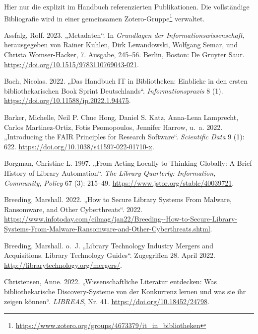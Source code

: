 \documentclass[
  11pt,
  letterpaper,
  DIV=11,
  twoside]{scrreprt}
\newlength{\cslhangindent}
\newenvironment{CSLReferences}[2] %
 {\begin{list}{}{%
  \setlength{\itemindent}{0pt}
  \setlength{\leftmargin}{0pt}
  \setlength{\parsep}{0pt}
  \ifodd #1
   \setlength{\leftmargin}{\cslhangindent}
   \setlength{\itemindent}{-1\cslhangindent}
  \fi
  \setlength{\itemsep}{#2\baselineskip}}}
 {\end{list}}
\DeclareRobustCommand{\href}[2]{#2\footnote{\url{#1}}}
\begin{document}
Hier nur die explizit im Handbuch referenzierten Publikationen. Die
vollständige Bibliografie wird
\href{https://www.zotero.org/groups/4673379/it_in_bibliotheken}{in einer
gemeinsamen Zotero-Gruppe} verwaltet.

\label{refs}
\begin{CSLReferences}{1}{0}
Assfalg, Rolf. 2023. {„Metadaten``}. In \emph{Grundlagen der
Informationswissenschaft}, herausgegeben von Rainer Kuhlen, Dirk
Lewandowski, Wolfgang Semar, und Christa Womser-Hacker, 7. Ausgabe,
245--56. Berlin, Boston: De Gruyter Saur.
\url{https://doi.org/10.1515/9783110769043-021}.

Bach, Nicolas. 2022. {„Das Handbuch {IT} in Bibliotheken: Einblicke in
den ersten bibliothekarischen Book Sprint Deutschlands``}.
\emph{Informationspraxis} 8 (1).
\url{https://doi.org/10.11588/ip.2022.1.94475}.

Barker, Michelle, Neil P. Chue Hong, Daniel S. Katz, Anna-Lena
Lamprecht, Carlos Martinez-Ortiz, Fotis Psomopoulos, Jennifer Harrow,
u.~a. 2022. {„Introducing the {FAIR} Principles for Research
Software``}. \emph{Scientific Data} 9 (1): 622.
\url{https://doi.org/10.1038/s41597-022-01710-x}.

Borgman, Christine L. 1997. {„From Acting Locally to Thinking Globally:
A Brief History of Library Automation``}. \emph{The Library Quarterly:
Information, Community, Policy} 67 (3): 215--49.
\url{https://www.jstor.org/stable/40039721}.

Breeding, Marshall. 2022. {„How to Secure Library Systems From Malware,
Ransomware, and Other Cyberthreats``}. 2022.
\url{https://www.infotoday.com/cilmag/jan22/Breeding--How-to-Secure-Library-Systems-From-Malware-Ransomware-and-Other-Cyberthreats.shtml}.

Breeding, Marshall. o.~J. {„Library Technology Industry Mergers and
Acquisitions. Library Technology Guides``}. Zugegriffen 28. April 2022.
\url{http://librarytechnology.org/mergers/}.

Christensen, Anne. 2022. {„Wissenschaftliche Literatur entdecken: Was
bibliothekarische Discovery-Systeme von der Konkurrenz lernen und was
sie ihr zeigen können``}. \emph{{LIBREAS}}, Nr. 41.
\url{https://doi.org/10.18452/24798}.


\end{CSLReferences}
\end{document}
